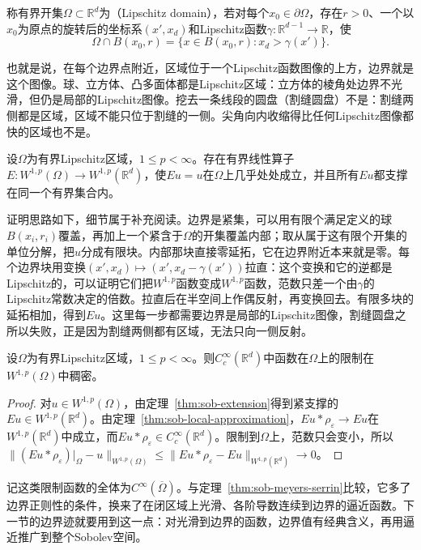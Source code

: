 \begin{definition}[Lipschitz区域]
\label{def:sob-lipschitz-domain}
称有界开集$\Omega\subset\mathbb R^d$为（Lipschitz domain），若对每个$x_0\in\partial\Omega$，存在$r>0$、一个以$x_0$为原点的旋转后的坐标系$(x',x_d)$和Lipschitz函数$\gamma:\mathbb R^{d-1}\to\mathbb R$，使
\[
 \Omega\cap B(x_0,r)=\{x\in B(x_0,r):x_d>\gamma(x')\}.
\]
\end{definition}

也就是说，在每个边界点附近，区域位于一个Lipschitz函数图像的上方，边界就是这个图像。球、立方体、凸多面体都是Lipschitz区域：立方体的棱角处边界不光滑，但仍是局部的Lipschitz图像。挖去一条线段的圆盘（割缝圆盘）不是：割缝两侧都是区域，区域不能只位于割缝的一侧。尖角向内收缩得比任何Lipschitz图像都快的区域也不是。

\begin{theorem}[Lipschitz区域上的延拓]
\label{thm:sob-extension}
设$\Omega$为有界Lipschitz区域，$1\le p<\infty$。存在有界线性算子$E:W^{1,p}(\Omega)\to W^{1,p}(\mathbb R^d)$，使$Eu=u$在$\Omega$上几乎处处成立，并且所有$Eu$都支撑在同一个有界集合内。
\end{theorem}

证明思路如下，细节属于补充阅读。边界是紧集，可以用有限个满足定义的球$B(x_i,r_i)$覆盖，再加上一个紧含于$\Omega$的开集覆盖内部；取从属于这有限个开集的单位分解，把$u$分成有限块。内部那块直接零延拓，它在边界附近本来就是零。每个边界块用变换$(x',x_d)\mapsto(x',x_d-\gamma(x'))$拉直：这个变换和它的逆都是Lipschitz的，可以证明它们把$W^{1,p}$函数变成$W^{1,p}$函数，范数只差一个由$\gamma$的Lipschitz常数决定的倍数。拉直后在半空间上作偶反射，再变换回去。有限多块的延拓相加，得到$Eu$。这里每一步都需要边界是局部的Lipschitz图像，割缝圆盘之所以失败，正是因为割缝两侧都有区域，无法只向一侧反射。

\begin{theorem}[光滑到边界的逼近]
\label{thm:sob-smooth-up-to-boundary}
设$\Omega$为有界Lipschitz区域，$1\le p<\infty$。则$C_c^\infty(\mathbb R^d)$中函数在$\Omega$上的限制在$W^{1,p}(\Omega)$中稠密。
\end{theorem}

\begin{proof}
对$u\in W^{1,p}(\Omega)$，由定理~\ref{thm:sob-extension}得到紧支撑的$Eu\in W^{1,p}(\mathbb R^d)$。由定理~\ref{thm:sob-local-approximation}，$Eu*\rho_\varepsilon\to Eu$在$W^{1,p}(\mathbb R^d)$中成立，而$Eu*\rho_\varepsilon\in C_c^\infty(\mathbb R^d)$。限制到$\Omega$上，范数只会变小，所以$\|(Eu*\rho_\varepsilon)|_\Omega-u\|_{W^{1,p}(\Omega)}\le\|Eu*\rho_\varepsilon-Eu\|_{W^{1,p}(\mathbb R^d)}\to0$。
\end{proof}

记这类限制函数的全体为$C^\infty(\overline\Omega)$。与定理~\ref{thm:sob-meyers-serrin}比较，它多了边界正则性的条件，换来了在闭区域上光滑、各阶导数连续到边界的逼近函数。下一节的边界迹就要用到这一点：对光滑到边界的函数，边界值有经典含义，再用逼近推广到整个Sobolev空间。
